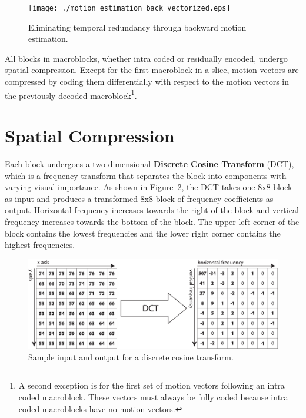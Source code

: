 \begin{figure}[h]
  \begin{center}
    \texttt{[image: ./motion\_estimation\_back\_vectorized.eps]}
    \caption{Eliminating temporal redundancy through backward motion estimation.}
    \label{fig:motion_estimation_back}
  \end{center}
\end{figure}

All blocks in macroblocks, whether intra coded or residually encoded, undergo 
spatial compression.
Except for the first macroblock in a slice, 
motion vectors are compressed by coding them differentially with respect to the 
motion vectors in the previously decoded 
macroblock\footnote{A second exception is for the first set of
motion vectors following an intra coded macroblock. These vectors 
must always be fully coded because intra coded macroblocks have no motion
vectors.}.

\section{Spatial Compression}
\label{sec:MPEGspatial}

Each block undergoes a two-dimensional \textbf{Discrete Cosine Transform} (DCT),
which is a frequency transform that separates the block into components
with varying visual importance. As shown in Figure~\ref{fig:dct}, 
the DCT takes one 8x8 block as input and produces a 
transformed 8x8 block of frequency coefficients as output. 
Horizontal frequency increases towards the right of the block and
vertical frequency increases towards the bottom of the block.
The upper left corner of the block contains the lowest frequencies
and the lower right corner contains the highest frequencies.

\begin{figure}
  \begin{center}
    \includegraphics[scale=0.6, angle=0]{./dct.eps}
    \caption{Sample input and output for a discrete cosine transform.}
    \label{fig:dct}
  \end{center}
\end{figure}

